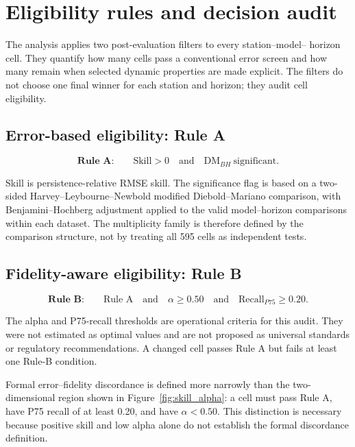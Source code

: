 \section{Eligibility rules and decision audit}
\label{sec:framework}

The analysis applies two post-evaluation filters to every station--model--
horizon cell. They quantify how many cells pass a conventional error
screen and how many remain when selected dynamic properties are made
explicit. The filters do not choose one final winner for each station and
horizon; they audit cell eligibility.

\subsection{Error-based eligibility: Rule A}

\begin{equation}
\textbf{Rule A:}\qquad \mathrm{Skill}>0\quad\text{and}\quad
\mathrm{DM}_{BH}\ \text{significant}.
\label{eq:rule-a}
\end{equation}

Skill is persistence-relative RMSE skill. The significance flag is based
on a two-sided Harvey--Leybourne--Newbold modified Diebold--Mariano
comparison, with Benjamini--Hochberg adjustment applied to the valid
model--horizon comparisons within each dataset. The multiplicity family is
therefore defined by the comparison structure, not by treating all 595
cells as independent tests.

\subsection{Fidelity-aware eligibility: Rule B}

\begin{equation}
\textbf{Rule B:}\qquad \text{Rule A}\quad\text{and}\quad
\alpha\geq0.50\quad\text{and}\quad \mathrm{Recall}_{P75}\geq0.20.
\label{eq:rule-b}
\end{equation}

The alpha and P75-recall thresholds are operational criteria for this
audit. They were not estimated as optimal values and are not proposed as
universal standards or regulatory recommendations. A changed cell passes
Rule A but fails at least one Rule-B condition.

Formal error--fidelity discordance is defined more narrowly than the
two-dimensional region shown in Figure~\ref{fig:skill_alpha}: a cell must
pass Rule A, have P75 recall of at least 0.20, and have $\alpha<0.50$.
This distinction is necessary because positive skill and low alpha alone
do not establish the formal discordance definition.
